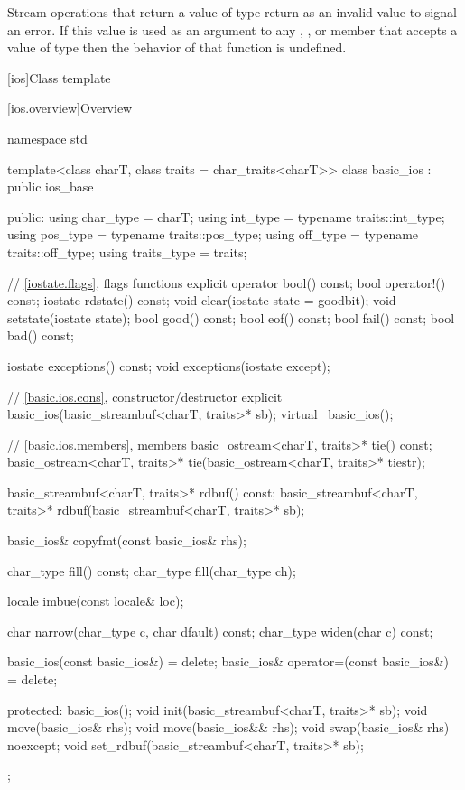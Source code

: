 \pnum
Stream operations that return a value of type
return
as an invalid value to signal an error.
If this value is used as an argument to any
,
,
or
 member
that accepts a value of type
then the behavior of that function is undefined.
%

[ios]{Class template }

[ios.overview]{Overview}

%
\begin{codeblock}
namespace std {
  template<class charT, class traits = char_traits<charT>>
  class basic_ios : public ios_base {
  public:
    using char_type   = charT;
    using int_type    = typename traits::int_type;
    using pos_type    = typename traits::pos_type;
    using off_type    = typename traits::off_type;
    using traits_type = traits;

    // \ref{iostate.flags}, flags functions
    explicit operator bool() const;
    bool operator!() const;
    iostate rdstate() const;
    void clear(iostate state = goodbit);
    void setstate(iostate state);
    bool good() const;
    bool eof()  const;
    bool fail() const;
    bool bad()  const;

    iostate exceptions() const;
    void exceptions(iostate except);

    // \ref{basic.ios.cons}, constructor/destructor
    explicit basic_ios(basic_streambuf<charT, traits>* sb);
    virtual ~basic_ios();

    // \ref{basic.ios.members}, members
    basic_ostream<charT, traits>* tie() const;
    basic_ostream<charT, traits>* tie(basic_ostream<charT, traits>* tiestr);

    basic_streambuf<charT, traits>* rdbuf() const;
    basic_streambuf<charT, traits>* rdbuf(basic_streambuf<charT, traits>* sb);

    basic_ios& copyfmt(const basic_ios& rhs);

    char_type fill() const;
    char_type fill(char_type ch);

    locale imbue(const locale& loc);

    char      narrow(char_type c, char dfault) const;
    char_type widen(char c) const;

    basic_ios(const basic_ios&) = delete;
    basic_ios& operator=(const basic_ios&) = delete;

  protected:
    basic_ios();
    void init(basic_streambuf<charT, traits>* sb);
    void move(basic_ios& rhs);
    void move(basic_ios&& rhs);
    void swap(basic_ios& rhs) noexcept;
    void set_rdbuf(basic_streambuf<charT, traits>* sb);
  };
}
\end{codeblock}

